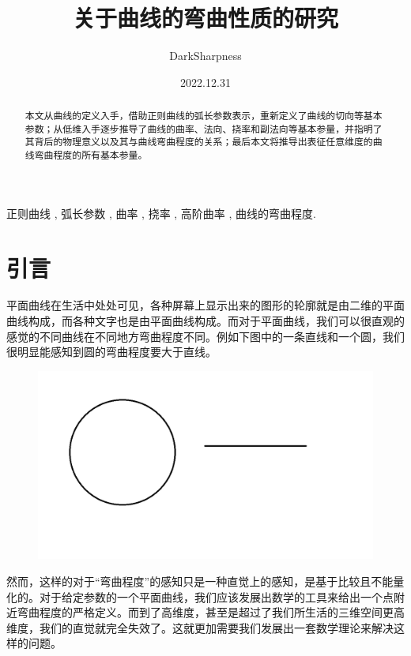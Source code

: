 \documentclass[fontset=windows]{article}
\title{\heiti\zihao{2} 关于曲线的弯曲性质的研究}
\author{DarkSharpness}
\date{2022.12.31}
\providecommand{\keywords}[1]
{
  \textbf{\text{Keywords: }} #1
}
\begin{document}
	\maketitle

\begin{abstract} 
    本文从曲线的定义入手，借助正则曲线的弧长参数表示，重新定义了曲线的切向等基本参数；从低维入手逐步推导了曲线的曲率、法向、挠率和副法向等基本参量，并指明了其背后的物理意义以及其与曲线弯曲程度的关系；最后本文将推导出表征任意维度的曲线弯曲程度的所有基本参量。
\end{abstract}


\keywords{正则曲线 , 弧长参数 , 曲率 , 挠率 , 高阶曲率 , 曲线的弯曲程度.}

\tableofcontents

\section*{引言}

平面曲线在生活中处处可见，各种屏幕上显示出来的图形的轮廓就是由二维的平面曲线构成，而各种文字也是由平面曲线构成。而对于平面曲线，我们可以很直观的感觉的不同曲线在不同地方弯曲程度不同。例如下图中的一条直线和一个圆，我们很明显能感知到圆的弯曲程度要大于直线。

\begin{figure}[htb]
	\centering
	\includegraphics[scale=0.3]{1.png}
	\caption{}
\end{figure}

然而，这样的对于“弯曲程度”的感知只是一种直觉上的感知，是基于比较且不能量化的。对于给定参数的一个平面曲线，我们应该发展出数学的工具来给出一个点附近弯曲程度的严格定义。而到了高维度，甚至是超过了我们所生活的三维空间更高维度，我们的直觉就完全失效了。这就更加需要我们发展出一套数学理论来解决这样的问题。
\end{document}
